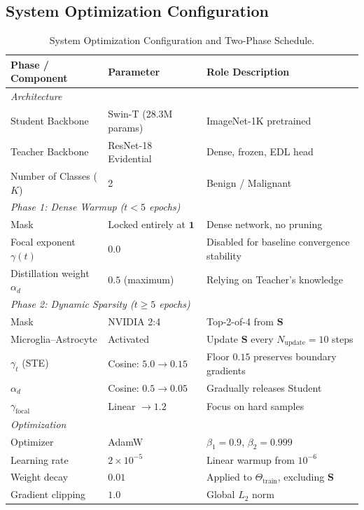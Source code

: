 \documentclass[letterpaper]{article} %
\begin{document}
\subsection{System Optimization Configuration}
\begin{table}[H]
\centering
\caption{System Optimization Configuration and Two-Phase Schedule.}
\label{tab:config}
\begin{tabular}{@{}lll@{}}
\toprule
\textbf{Phase / Component} & \textbf{Parameter} & \textbf{Role Description} \\
\midrule
\multicolumn{3}{l}{\emph{Architecture}} \\
Student Backbone & Swin-T (28.3M params) & ImageNet-1K pretrained \\
Teacher Backbone & ResNet-18 Evidential & Dense, frozen, EDL head \\
Number of Classes ($K$) & 2 & Benign / Malignant \\
\midrule
\multicolumn{3}{l}{\emph{Phase 1: Dense Warmup ($t < 5$ epochs)}} \\
Mask & Locked entirely at $\bm{1}$ & Dense network, no pruning \\
Focal exponent $\gamma(t)$ & $0.0$ & Disabled for baseline convergence stability \\
Distillation weight $\alpha_d$ & $0.5$ (maximum) & Relying on Teacher's knowledge \\
\midrule
\multicolumn{3}{l}{\emph{Phase 2: Dynamic Sparsity ($t \ge 5$ epochs)}} \\
Mask & NVIDIA 2:4 & Top-2-of-4 from $\bm{S}$ \\
Microglia--Astrocyte & Activated & Update $\bm{S}$ every $N_{\text{update}} = 10$ steps \\
$\gamma_t$ (STE) & Cosine: $5.0 \to 0.15$ & Floor $0.15$ preserves boundary gradients \\
$\alpha_d$ & Cosine: $0.5 \to 0.05$ & Gradually releases Student \\
$\gamma_{\text{focal}}$ & Linear $\to 1.2$ & Focus on hard samples \\
\midrule
\multicolumn{3}{l}{\emph{Optimization}} \\
Optimizer & AdamW~\cite{loshchilov2019decoupled, kingma2015adam} & $\beta_1=0.9$, $\beta_2=0.999$ \\
Learning rate & $2 \times 10^{-5}$ & Linear warmup from $10^{-6}$ \\
Weight decay & $0.01$ & Applied to $\Theta_{\text{train}}$, excluding $\bm{S}$ \\
Gradient clipping & $1.0$ & Global $L_2$ norm \\

\end{tabular}
\end{table}
\end{document}
